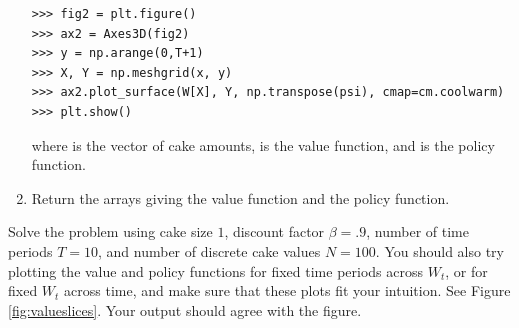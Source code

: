 \begin{problem}
\begin{enumerate}
\begin{lstlisting}
>>> fig2 = plt.figure()
>>> ax2 = Axes3D(fig2)
>>> y = np.arange(0,T+1)
>>> X, Y = np.meshgrid(x, y)
>>> ax2.plot_surface(W[X], Y, np.transpose(psi), cmap=cm.coolwarm)
>>> plt.show()
\end{lstlisting}
where  is the vector of cake amounts,  is the value function, and  is the policy function.

\item Return the arrays giving the value function and the policy function.
\end{enumerate}

Solve the problem using cake size $1$, discount factor $\beta = .9$, number of time periods $T = 10$, and number of
discrete cake values $N = 100$. You should also try plotting the value and policy functions for fixed time periods across
$W_t$, or for fixed $W_t$ across time,
 and make sure that these plots fit your intuition. See Figure \ref{fig:valueslices}. Your output should
agree with the figure.
\end{problem}

